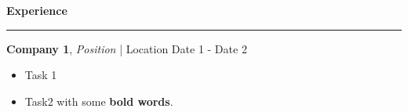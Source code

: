 

\textbf{Experience}

\par\noindent\rule{\textwidth}{0.2pt}


{\textbf{Company 1}, \textnormal{\textit{Position} | Location}} \hfill {Date 1 - Date 2} 
{%
    \begin{itemize}
        \item {Task 1}
        \item {Task2 with some \textbf{bold words}.}
    \end{itemize}
}
